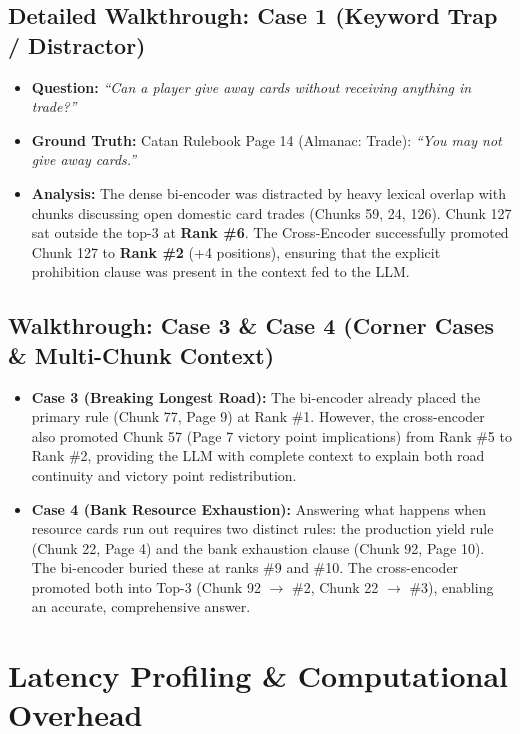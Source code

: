 \documentclass[11pt,a4paper]{article}
\begin{document}
\subsection{Detailed Walkthrough: Case 1 (Keyword Trap / Distractor)}
\begin{itemize}[itemsep=1.5pt,topsep=1.5pt]
    \item \textbf{Question:} \textit{``Can a player give away cards without receiving anything in trade?''}
    \item \textbf{Ground Truth:} Catan Rulebook Page 14 (Almanac: Trade): \textit{``You may not give away cards.''}
    \item \textbf{Analysis:} The dense bi-encoder was distracted by heavy lexical overlap with chunks discussing open domestic card trades (Chunks 59, 24, 126). Chunk 127 sat outside the top-3 at \textbf{Rank \#6}. The Cross-Encoder successfully promoted Chunk 127 to \textbf{Rank \#2} (+4 positions), ensuring that the explicit prohibition clause was present in the context fed to the LLM.
\end{itemize}

\subsection{Walkthrough: Case 3 \& Case 4 (Corner Cases \& Multi-Chunk Context)}
\begin{itemize}[itemsep=1.5pt,topsep=1.5pt]
    \item \textbf{Case 3 (Breaking Longest Road):} The bi-encoder already placed the primary rule (Chunk 77, Page 9) at Rank \#1. However, the cross-encoder also promoted Chunk 57 (Page 7 victory point implications) from Rank \#5 to Rank \#2, providing the LLM with complete context to explain both road continuity and victory point redistribution.
    \item \textbf{Case 4 (Bank Resource Exhaustion):} Answering what happens when resource cards run out requires two distinct rules: the production yield rule (Chunk 22, Page 4) and the bank exhaustion clause (Chunk 92, Page 10). The bi-encoder buried these at ranks \#9 and \#10. The cross-encoder promoted both into Top-3 (Chunk 92 $\to$ \#2, Chunk 22 $\to$ \#3), enabling an accurate, comprehensive answer.
\end{itemize}

\section{Latency Profiling \& Computational Overhead}
\end{document}
